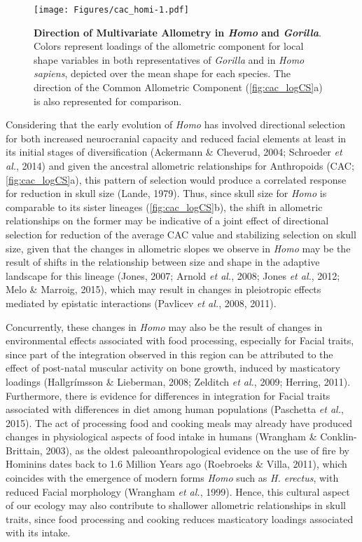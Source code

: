 \documentclass[12pt,twoside]{report}
\begin{document}
\begin{figure}[htbp]
\centering
\texttt{[image: Figures/cac\_homi-1.pdf]}
\caption{\textbf{Direction of Multivariate Allometry in \emph{Homo} and
\emph{Gorilla}}. Colors represent loadings of the allometric component
for local shape variables in both representatives of \emph{Gorilla} and
in \emph{Homo sapiens}, depicted over the mean shape for each species.
The direction of the Common Allometric Component
(\autoref{fig:cac_logCS}a) is also represented for comparison.
\label{fig:cac_homi}}
\end{figure}

Considering that the early evolution of \emph{Homo} has involved
directional selection for both increased neurocranial capacity and
reduced facial elements at least in its initial stages of
diversification (Ackermann \& Cheverud, 2004; Schroeder \emph{et al.},
2014) and given the ancestral allometric relationships for Anthropoids
(CAC; \autoref{fig:cac_logCS}a), this pattern of selection would produce
a correlated response for reduction in skull size (Lande, 1979). Thus,
since skull size for \emph{Homo} is comparable to its sister lineages
(\autoref{fig:cac_logCS}b), the shift in allometric relationships on the
former may be indicative of a joint effect of directional selection for
reduction of the average CAC value and stabilizing selection on skull
size, given that the changes in allometric slopes we observe in
\emph{Homo} may be the result of shifts in the relationship between size
and shape in the adaptive landscape for this lineage (Jones, 2007;
Arnold \emph{et al.}, 2008; Jones \emph{et al.}, 2012; Melo \& Marroig,
2015), which may result in changes in pleiotropic effects mediated by
epistatic interactions (Pavlicev \emph{et al.}, 2008, 2011).

Concurrently, these changes in \emph{Homo} may also be the result of
changes in environmental effects associated with food processing,
especially for Facial traits, since part of the integration observed in
this region can be attributed to the effect of post-natal muscular
activity on bone growth, induced by masticatory loadings (Hallgrímsson
\& Lieberman, 2008; Zelditch \emph{et al.}, 2009; Herring, 2011).
Furthermore, there is evidence for differences in integration for Facial
traits associated with differences in diet among human populations
(Paschetta \emph{et al.}, 2015). The act of processing food and cooking
meals may already have produced changes in physiological aspects of food
intake in humans (Wrangham \& Conklin-Brittain, 2003), as the oldest
paleoanthropological evidence on the use of fire by Hominins dates back
to 1.6 Million Years ago (Roebroeks \& Villa, 2011), which coincides
with the emergence of modern forms \emph{Homo} such as \emph{H.
erectus}, with reduced Facial morphology (Wrangham \emph{et al.}, 1999).
Hence, this cultural aspect of our ecology may also contribute to
shallower allometric relationships in skull traits, since food
processing and cooking reduces masticatory loadings associated with its
intake.
\end{document}
